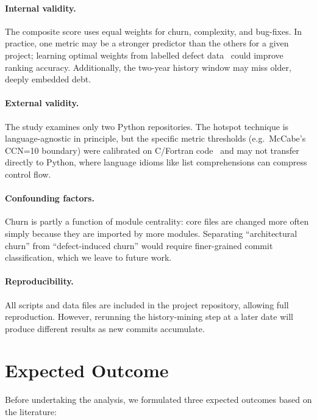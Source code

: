 \documentclass[12pt,a4paper]{article}
\begin{document}
\paragraph{Internal validity.}
The composite score uses equal weights for churn, complexity, and bug-fixes.
In practice, one metric may be a stronger predictor than the others for a given project; learning optimal weights from labelled defect data~\cite{nagappan2005} could improve ranking accuracy.
Additionally, the two-year history window may miss older, deeply embedded debt.

\paragraph{External validity.}
The study examines only two Python repositories.
The hotspot technique is language-agnostic in principle, but the specific metric thresholds (e.g.\ McCabe's CCN=10 boundary) were calibrated on C/Fortran code~\cite{mccabe1976} and may not transfer directly to Python, where language idioms like list comprehensions can compress control flow.

\paragraph{Confounding factors.}
Churn is partly a function of module centrality: core files are changed more often simply because they are imported by more modules.
Separating ``architectural churn'' from ``defect-induced churn'' would require finer-grained commit classification, which we leave to future work.

\paragraph{Reproducibility.}
All scripts and data files are included in the project repository, allowing full reproduction.
However, rerunning the history-mining step at a later date will produce different results as new commits accumulate.

\section{Expected Outcome}
\label{sec:expected}

Before undertaking the analysis, we formulated three expected outcomes based on the literature:
\end{document}
